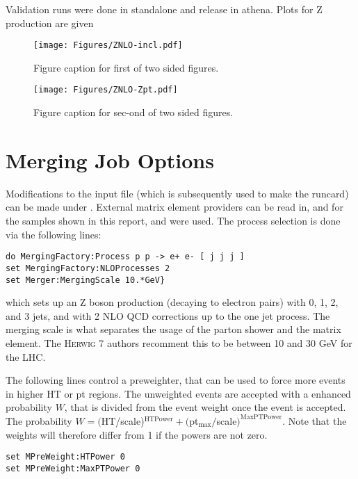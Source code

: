 Validation runs were done in  standalone and  release in athena. Plots for Z production are given 

\begin{figure}[h]
\begin{minipage}{17pc}
\texttt{[image: Figures/ZNLO-incl.pdf]}
\caption{Figure caption for first of two sided figures.}
\end{minipage}\hspace{2pc}
\begin{minipage}{17pc}
\texttt{[image: Figures/ZNLO-Zpt.pdf]}
\caption{Figure caption for sec-ond of two sided figures.}
\end{minipage} 
\end{figure}

\section{Merging Job Options}

Modifications to the  input file (which is subsequently used to make the runcard) can be made under . External matrix element providers can be read in, and for the samples shown in this report,  and  were used. The process selection is done via the following lines:

\noindent
\begin{verbatim}
do MergingFactory:Process p p -> e+ e- [ j j j ]
set MergingFactory:NLOProcesses 2
set Merger:MergingScale 10.*GeV}
\end{verbatim}

\noindent
which sets up an Z boson production (decaying to electron pairs) with 0, 1, 2, and 3 jets, and with 2 NLO QCD corrections up to the one jet process. The merging scale is what separates the usage of the parton shower and the matrix element. The \textsc{Herwig 7} authors recomment this to be between 10 and 30 GeV for the LHC.

The following lines control a preweighter, that can be used to force more events in higher HT or pt regions. The unweighted events are accepted with a enhanced probability $W$, that is divided from the event weight once the event is accepted. The probability $W = ($HT/scale)$^{\text{HTPower}} + ($pt$_{\text{max}}/$scale$)^{\text{MaxPTPower}}$. Note that the weights will therefore differ from 1 if the powers are not zero.

\noindent
\begin{verbatim}
set MPreWeight:HTPower 0
set MPreWeight:MaxPTPower 0
\end{verbatim}

